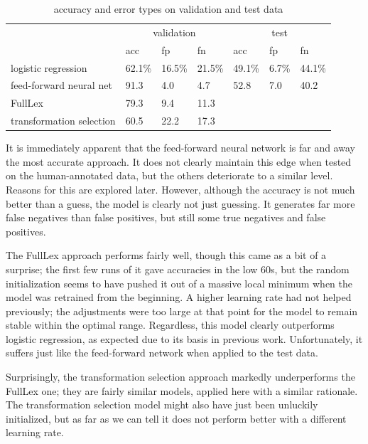 \documentclass[a4paper, 12pt]{scrartcl}
\begin{document}
\begin{table}[]
	\centering
	\begin{tabular}{l|lll|lll}
		                         & \multicolumn{3}{c|}{validation} & \multicolumn{3}{c}{test}  \\
		                         & acc      & fp       & fn        & acc     & fp     & fn     \\ \hline
		logistic regression      & 62.1\%   & 16.5\%   & 21.5\%    & 49.1\%  & 6.7\%  & 44.1\% \\
		feed-forward neural net  & 91.3     & 4.0      & 4.7       & 52.8    & 7.0    & 40.2   \\
		FullLex                  & 79.3     & 9.4      & 11.3      &         &        &        \\
		transformation selection & 60.5     & 22.2     & 17.3      &         &        &      
	\end{tabular}
	\caption{accuracy and error types on validation and test data}
	\label{accuracy-an}
\end{table}

It is immediately apparent that the feed-forward neural network is far and away the most accurate approach. It does not clearly maintain this edge when tested on the human-annotated data, but the others deteriorate to a similar level. Reasons for this are explored later. However, although the accuracy is not much better than a guess, the model is clearly not just guessing. It generates far more false negatives than false positives, but still some true negatives and false positives.

The FullLex approach performs fairly well, though this came as a bit of a surprise; the first few runs of it gave accuracies in the low 60s, but the random initialization seems to have pushed it out of a massive local minimum when the model was retrained from the beginning. A higher learning rate had not helped previously; the adjustments were too large at that point for the model to remain stable within the optimal range. Regardless, this model clearly outperforms logistic regression, as expected due to its basis in previous work. Unfortunately, it suffers just like the feed-forward network when applied to the test data.

Surprisingly, the transformation selection approach markedly underperforms the FullLex one; they are fairly similar models, applied here with a similar rationale. The transformation selection model might also have just been unluckily initialized, but as far as we can tell it does not perform better with a different learning rate.
\end{document}
